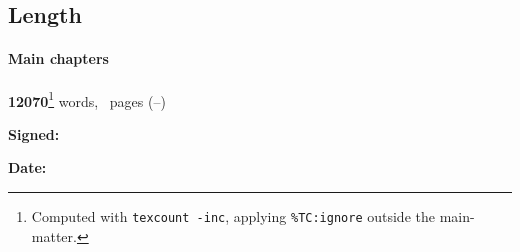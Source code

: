 \ifanonymised
\subsection*{Length}

\paragraph{Main chapters} 
\textbf{\color{red} 12070}\footnote{Computed with \texttt{texcount -inc}, applying \texttt{\%TC:ignore} outside the main-matter.} words, \textbf{\contentpages}~pages
(\pageref{firstcontentpage}--\pageref{lastcontentpage})

\fi

\vfill

\textbf{Signed:} 
\ifanonymised
\candidate
\else
\authorself{}
\fi

\vspace{0.5cm}
\textbf{Date:} \submissiondate{}
\vspace{3cm}

\endgroup
